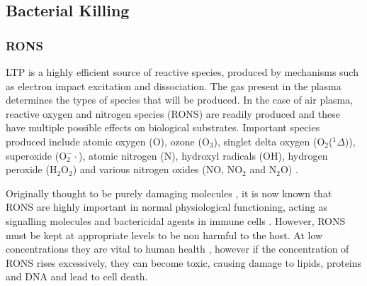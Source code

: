 \documentclass[11pt, oneside]{article}   	%
\begin{document}
\subsection{Bacterial Killing}
\subsubsection{RONS}
LTP is a highly efficient source of reactive species, produced by mechanisms such as electron impact excitation and dissociation.
The gas present in the plasma determines the types of species that will be produced. 
In the case of air plasma, reactive oxygen and nitrogen species (RONS) are readily produced and these have multiple possible effects on biological substrates.
Important species produced include atomic oxygen (O), ozone (O$_3$), singlet delta oxygen (O$_2$($^1\Delta$)), superoxide (O$_2^-\cdot$), atomic nitrogen (N), hydroxyl radicals (OH), hydrogen peroxide (H$_2$O$_2$) and various nitrogen oxides (NO, NO$_2$ and N$_2$O) \cite{Graves2014low}.

Originally thought to be purely damaging molecules \cite{Harman1955aging}, it is now known that RONS are highly important in normal physiological functioning, acting as signalling molecules and bactericidal agents in immune cells \cite{Thannickal2000reactive}.
However, RONS must be kept at appropriate levels to be non harmful to the host.
At low concentrations they are vital to human health \cite{Fang2004antimicrobial}, however if the concentration of RONS rises excessively, they can become toxic, causing damage to lipids, proteins and DNA \cite{PhamHuy2008free} and lead to cell death.
\end{document}
